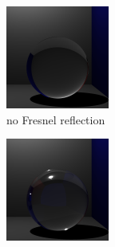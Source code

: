 \begin{figure}[h]
\centering
\begin{subfigure}[b]{0.3\textwidth}
	\includegraphics[width=\textwidth]{./images/renders/refraction/no-reflection.png}
	\caption{no Fresnel reflection}
\end{subfigure}
\begin{subfigure}[b]{0.3\textwidth}
	\includegraphics[width=\textwidth]{./images/renders/refraction/fresnel-reflection.png}

\end{subfigure}
\end{figure}

